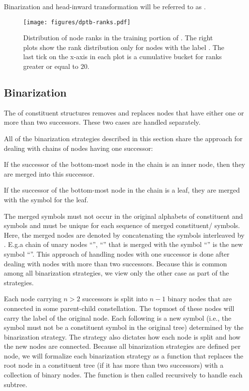 \documentclass[../../document.tex]{subfiles}
\begin{document}
    Binarization and head-inward transformation will be referred to as .

    \begin{figure}
        \texttt{[image: figures/dptb-ranks.pdf]}
        \caption{\label{fig:extraction:ranks}
            Distribution of node ranks in the training portion of .
            The right plots show the rank distribution only for nodes with the label .
            The last tick on the x-axis in each plot is a cumulative bucket for ranks greater or equal to \(20\).
        }
    \end{figure}

    \subsection{Binarization}\label{sec:binarization}
    The  of constituent structures removes and replaces nodes that have either one or more than two successors.
    These two cases are handled separately.

    All of the binarization strategies described in this section share the approach for dealing with chains of nodes having one successor:
    \begin{inparaenum}
        \item If the successor of the bottom-most node in the chain is an inner node, then they are merged into this successor.
        \item If the successor of the bottom-most node in the chain is a leaf, they are merged with the  symbol for the leaf.
    \end{inparaenum}
    The merged symbols must not occur in the original alphabets of constituent and  symbols and must be unique for each sequence of merged constituent/ symbols.
    Here, the merged nodes are denoted by concatenating the symbols interleaved by \cn{+}.
    E.g.\@ a chain of unary nodes ``'', ``'' that is merged with the  symbol ``'' is the new symbol ``''.
    This approach of handling nodes with one successor is done after dealing with nodes with more than two successors.
    Because this is common among all binarization strategies, we view only the other case as part of the strategies.

    Each node carrying \( n > 2 \) successors is split into \( n-1 \) binary nodes that are connected in some parent-child constellation.
    The topmost of these nodes will carry the label of the original node. Each following is a new symbol (i.e., the symbol must not be a constituent symbol in the original tree) determined by the binarization strategy.
    The strategy also dictates how each node is split and how the new nodes are connected.
    Because all binarization strategies are defined per node, we will formalize each binarization strategy as a function that replaces the root node in a constituent tree (if it has more than two successors) with a collection of binary nodes.
    The function is then called recursively to handle each subtree.
\end{document}
